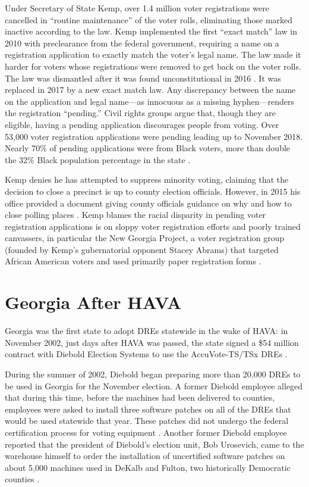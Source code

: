 \documentclass[runningheads]{llncs}
\begin{document}
Under Secretary of State Kemp, over 1.4 million voter registrations were 
cancelled in ``routine maintenance'' of the voter rolls,
eliminating those marked inactive according to the law.
Kemp implemented the first ``exact match'' law in 2010 with preclearance from the federal government, requiring a name on a registration application
to exactly match the voter's legal name.
The law made it harder for voters whose registrations were removed to get back on the voter rolls.
The law was dismantled after it was found unconstitutional in 2016 \cite{torres_federal_2016}.
It was replaced in 2017 by a new exact match law.
Any discrepancy between the name on the application and legal name---as innocuous as a missing hyphen---renders the registration ``pending.''
Civil rights groups argue that, though they are eligible,
having a pending application discourages people from voting.
Over 53,000 voter registration applications were pending leading up to November 2018.
Nearly 70\% of pending applications were from Black voters, 
more than double the 32\% Black population percentage in the state
 \cite{nadler_voting_2018}.

Kemp denies he has attempted to suppress minority voting, claiming that the decision
to close a precinct is up to county election officials.
However, in 2015 his office provided a document giving county officials guidance on why and how 
to close polling places \cite{niesse_voting_2018}.
Kemp blames the racial disparity in pending voter registration applications is on sloppy voter registration efforts and poorly trained canvassers, 
in particular the New Georgia Project, a voter registration group (founded by Kemp's gubernatorial opponent 
Stacey Abrams) that targeted African American voters and used primarily paper registration forms \cite{nadler_voting_2018}.

\section{Georgia After HAVA}
Georgia was the first state to adopt DREs statewide in the wake of HAVA:
in November 2002, just days after HAVA was passed,
the state signed a \$54 million contract with Diebold Election Systems
to use the AccuVote-TS/TSx DREs \cite{zetter_crisis_2018}. 

During the summer of 2002, Diebold began preparing more than 20,000 DREs to 
be used in Georgia for the November election.
A former Diebold employee alleged that during this time, before the machines had been delivered to counties, 
employees were asked to install three software patches on all of the DREs that would be used statewide that year.
These patches did not undergo the federal certification process for voting equipment \cite{zetter_did_2003}.
Another former Diebold employee reported that the president of Diebold's
election unit, Bob Urosevich, came to the warehouse himself to order the installation of
uncertified software patches on about 5,000 machines used in DeKalb and Fulton,
two historically Democratic counties \cite{kennedy_robert_2006}.
\end{document}
